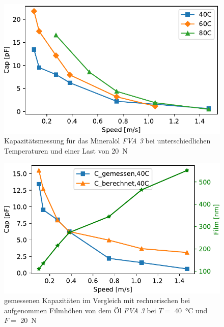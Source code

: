 \begin{figure}[htb]
    \centering
    \includegraphics[]{./images/cap_vs_speed_dif_temp_meas.pdf}
    \caption{Kapazitätsmessung für das Mineralöl \textit{FVA 3} bei unterschiedlichen Temperaturen und einer Last von \SI{20}{\N}}
    \label{fig:cap_vs_speed_dif_temp_meas}
\end{figure}

\begin{figure}[htb]
    \centering
    \includegraphics[]{./images/cap_theo_meas_vs_speed_40C.pdf}
    \caption{gemessenen Kapazitäten im Vergleich mit rechnerischen bei aufgenommen Filmhöhen von dem Öl \textit{FVA 3} bei $T =$ \SI{40}{\degreeCelsius} und $F =$ \SI{20}{\N}}
    \label{fig:cap_meas_cap_theo_40C}
\end{figure}

